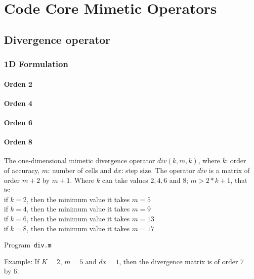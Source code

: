 \chapter{Code Core Mimetic Operators}

\section{Divergence operator}

\subsection{1D Formulation}

\subsubsection{Orden 2}
\subsubsection{Orden 4}
\subsubsection{Orden 6}
\subsubsection{Orden 8}

The one-dimensional mimetic divergence operator $div(k,m,k)$, where $k$: order of accuracy, $m$: number of cells and $dx$: step size. The operator $div$ is a matrix of order $m+2$ by $m+1$. Where $k$ can take values $​​2, 4, 6$ and $8$; $m > 2*k+1$, that is:\\

if $k=2$, then the minimum value it takes $m=5$\\
if $k=4$, then the minimum value it takes $m=9$\\
if $k=6$, then the minimum value it takes $m=13$\\
if $k=8$, then the minimum value it takes $m=17$\\

\begin{octavelisting}
	\tiny
	\centering
	\caption{Program~\texttt{div.m}}
	\label{code:div.m}
\end{octavelisting}

Example: If  $K=2$, $m=5$ and $dx=1$, then the divergence matrix is ​​of order 7 by 6.

